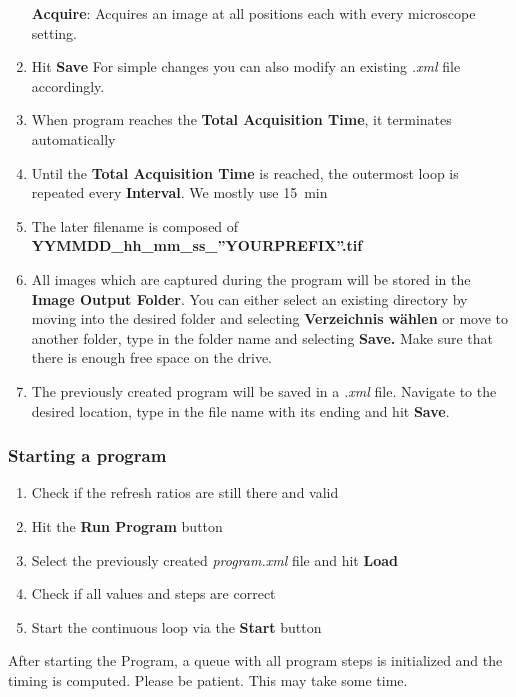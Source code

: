 \documentclass{article}
\newcounter{ListCounter}
\begin{document}
\begin{enumerate}
	\subitem \textbf{Acquire}: Acquires an image at all positions each with every microscope setting.
	\item Hit \textbf{Save} 
	\subitem For simple changes you can also modify an existing \textit{.xml} file accordingly.
	\item When program reaches the \textbf{Total Acquisition Time}, it terminates automatically
	\item Until the \textbf{Total Acquisition Time} is reached, the outermost loop is repeated every \textbf{Interval}. We mostly use \SI{15}{\minute}
	\item The later filename is composed of \textbf{YYMMDD\_{}hh\_{}mm\_{}ss\_{}''YOURPREFIX''.tif}
	\item All images which are captured during the program will be stored in the \textbf{Image Output Folder}. You can either select an existing directory by moving into the desired folder and selecting \textbf{Verzeichnis wählen} or move to another folder, type in the folder name and selecting \textbf{Save. }Make sure that there is enough free space on the drive.
	\item The previously created program will be saved in a \textit{.xml} file. Navigate to the desired location, type in the file name with its ending and hit \textbf{Save}. 

	
		\setcounter{ListCounter}{\value{enumi}}
\end{enumerate}
	\subsubsection{Starting a program}
\begin{enumerate}
\setcounter{enumi}{\value{ListCounter}}
\item Check if the refresh ratios are still there and valid
\item Hit the \textbf{Run Program} button
\item Select the previously created \textit{program.xml} file and hit \textbf{Load}
\item Check if all values and steps are correct
\item Start the continuous loop via the \textbf{Start} button
\end{enumerate}
After starting the Program, a queue with all program steps is initialized and the timing is computed. Please be patient. This may take some time.
\end{document}
